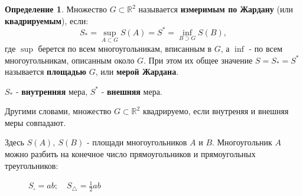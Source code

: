 \documentclass{report}
\theoremstyle{definition}
\newtheorem{definition}{Определение}[section]
\begin{document}
\begin{definition}
  Множество $G\subset\mathbb{R}^2$ называется \textbf{измеримым по Жардану} (или \textbf{квадрируемым}),
  если:
  \begin{equation*}
    S_* = \underset{A\subset G}{\sup} S(A) = S^* = \underset{B\supset G}{\inf}S(B),
  \end{equation*}
  где $\sup$ берется по всем многоугольникам, вписанным в $G$, а $\inf$ - по всем многоугольникам,
  описанным около $G$. При этом их общее значение $S = S_* = S^*$ называется \textbf{площадью} $G$,
  или \textbf{мерой Жардана}.
  \begin{center}
    $S_*$ - \textbf{внутренняя} мера, $S^*$ - \textbf{внешняя} мера.
  \end{center}

  Другими словами, множество $G\subset\mathbb{R}^2$ квадрируемо, если внутреняя и внешняя меры совпадают.

  Здесь $S(A),\ S(B)$ - площади многоугольников $A$ и $B$. Многоугольник $A$ можно разбить на конечное число
  прямоугольников и прямоугольных треугольников:
  \begin{figure}[h]
    \begin{minipage}[h]{0.49\linewidth}
    \end{minipage}
    \hfill
    \begin{minipage}[h]{0.49\linewidth}
      $S_\square = ab; \quad S_\triangle = \frac{1}{2}ab$
    \end{minipage}
  \end{figure}
\end{definition}
\end{document}
